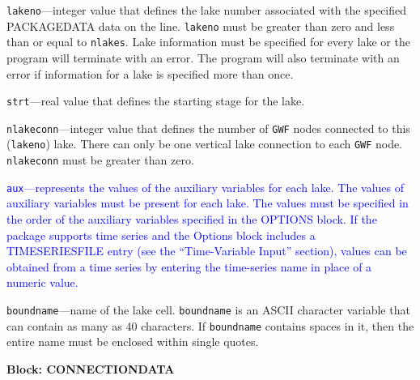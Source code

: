 \begin{description}
\item \texttt{lakeno}---integer value that defines the lake number associated with the specified PACKAGEDATA data on the line. \texttt{lakeno} must be greater than zero and less than or equal to \texttt{nlakes}. Lake information must be specified for every lake or the program will terminate with an error.  The program will also terminate with an error if information for a lake is specified more than once.

\item \texttt{strt}---real value that defines the starting stage for the lake.

\item \texttt{nlakeconn}---integer value that defines the number of \texttt{GWF} nodes connected to this (\texttt{lakeno}) lake. There can only be one vertical lake connection to each \texttt{GWF} node. \texttt{nlakeconn} must be greater than zero.

\item \textcolor{blue}{\texttt{aux}---represents the values of the auxiliary variables for each lake. The values of auxiliary variables must be present for each lake. The values must be specified in the order of the auxiliary variables specified in the OPTIONS block.  If the package supports time series and the Options block includes a TIMESERIESFILE entry (see the ``Time-Variable Input'' section), values can be obtained from a time series by entering the time-series name in place of a numeric value.}

\item \texttt{boundname}---name of the lake cell.  \texttt{boundname} is an ASCII character variable that can contain as many as 40 characters.  If \texttt{boundname} contains spaces in it, then the entire name must be enclosed within single quotes.

\end{description}
\item \textbf{Block: CONNECTIONDATA}

